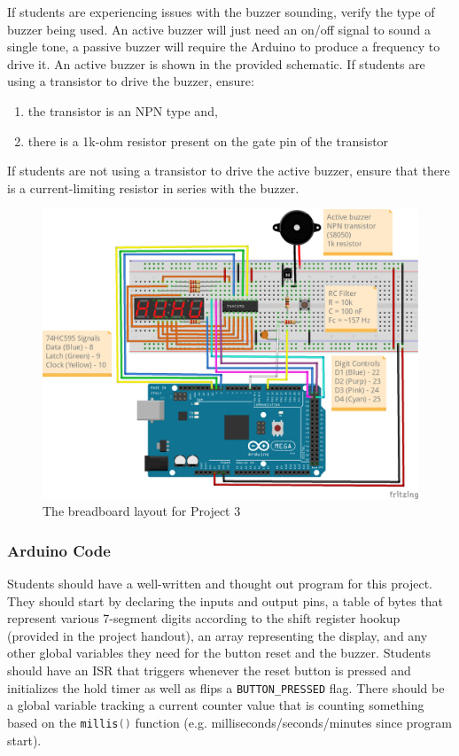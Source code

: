 \documentclass{article}
\begin{document}
        If students are experiencing issues with the buzzer sounding, verify the type of buzzer being used.
        An active buzzer will just need an on/off signal to sound a single tone, a passive buzzer will require the Arduino to produce a frequency to drive it.
        An active buzzer is shown in the provided schematic.
        If students are using a transistor to drive the buzzer, ensure:
        \begin{enumerate}
            \item the transistor is an NPN type and,
            \item there is a 1k-ohm resistor present on the gate pin of the transistor
        \end{enumerate}
        If students are not using a transistor to drive the active buzzer, ensure that there is a current-limiting resistor in series with the buzzer.

        \begin{figure}
            \centering
            \includegraphics[]{p3_7seg_counter_ugrad_bb.png}
            \caption{The breadboard layout for Project 3}
            \label{fig:p3_7seg_counter_bb}
        \end{figure}

        \subsubsection*{Arduino Code}
        Students should have a well-written and thought out program for this project.
        They should start by declaring the inputs and output pins, a table of bytes that represent various 7-segment digits according to the shift register hookup (provided in the project handout), an array representing the display, and any other global variables they need for the button reset and the buzzer.
        Students should have an ISR that triggers whenever the reset button is pressed and initializes the hold timer as well as flips a \lstinline[language=C++, style=mystyle]{BUTTON_PRESSED} flag.
        There should be a global variable tracking a current counter value that is counting something based on the \lstinline[language=C++, style=mystyle]{millis()} function (e.g. milliseconds/seconds/minutes since program start).
\end{document}
